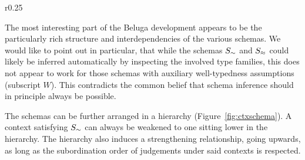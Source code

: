 \begin{wrapfigure}{r}{0.25\textwidth}
  \centering
  \vspace{-0.5em}
  \caption{Hierarchy of Context Schemas}
  \label{fig:ctxschema}
\end{wrapfigure}

The most interesting part of the Beluga development appears to be the particularly rich structure and interdependencies of the various schemas.
We would like to point out in particular, that while the schemas $S_{\mathrel{\sim}}$ and $S_{\mathrel{\approx}}$ could likely be inferred automatically by inspecting the involved type families, this does not appear to work for those schemas with auxiliary well-typedness assumptions (subscript $W$).
This contradicts the common belief that schema inference should in principle always be possible.

The schemas can be further arranged in a hierarchy (Figure~\ref{fig:ctxschema}).
A context satisfying $S_{\mathrel{\sim}}$ can always be weakened to one sitting lower in the hierarchy.
The hierarchy also induces a strengthening relationship, going upwards, as long as the subordination order of judgements under said contexts is respected.

